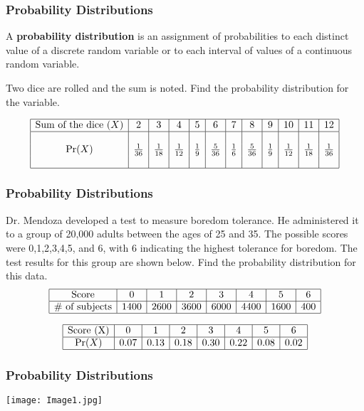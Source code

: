 \documentclass[Lecture.tex]{subfiles}
\begin{document}
\begin{frame}
\frametitle{Probability Distributions}\pause
\begin{definition}
A \textbf{probability distribution} is an assignment of probabilities to each distinct value of a discrete random variable or to each interval of values of a continuous random variable.
\end{definition}\pause
\begin{example}
Two dice are rolled and the sum is noted.  Find the probability distribution for the variable.
\end{example}\pause
$$\begin{array}{|c|c|c|c|c|c|c|c|c|c|c|c|}
\hline
\text{Sum of the dice }(X)&2&3&4&5&6&7&8&9&10&11&12\\
\hline
&&&&&&&&&&&\\
\Pr(X)&\frac{1}{36}&\frac{1}{18}&\frac{1}{12}&\frac{1}{9}&\frac{5}{36}&\frac{1}{6}&\frac{5}{36}&\frac{1}{9}&\frac{1}{12}&\frac{1}{18}&\frac{1}{36}\\
&&&&&&&&&&&\\
\hline
\end{array}$$
\end{frame}

\begin{frame}
\frametitle{Probability Distributions}\pause
\begin{example}
Dr. Mendoza developed a test to measure boredom tolerance.  He administered it to a group of 20,000 adults between the ages of 25 and 35.  The possible scores were 0,1,2,3,4,5, and 6, with 6 indicating the highest tolerance for boredom.  The test results for this group are shown below.  Find the probability distribution for this data.
$$\begin{array}{|c|c|c|c|c|c|c|c|}
\hline
\text{Score}&0&1&2&3&4&5&6\\
\hline
\text{\# of subjects}&1400&2600&3600&6000&4400&1600&400\\
\hline
\end{array}$$
\end{example}\pause
$$\begin{array}{|c|c|c|c|c|c|c|c|}
\hline
\text{Score (X)}&0&1&2&3&4&5&6\\
\hline
\Pr(X)&0.07&0.13&0.18&0.30&0.22&0.08&0.02\\
\hline
\end{array}$$
\end{frame}

\begin{frame}
\frametitle{Probability Distributions}\pause
\centerline{\texttt{[image: Image1.jpg]}}
\end{frame}
\end{document}
